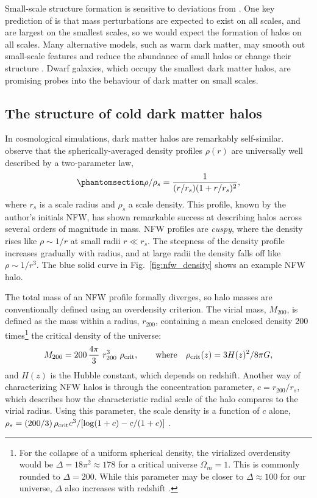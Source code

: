 Small-scale structure formation is sensitive to deviations from \LCDM{}
\citep[e.g.,][]{bechtol+2022}. One key prediction of \LCDM{} is that
mass perturbations are expected to exist on all scales, and are largest
on the smallest scales, so we would expect the formation of halos on all
scales. Many alternative models, such as warm dark matter, may smooth
out small-scale features and reduce the abundance of small halos or
change their structure \citep[e.g.,][]{lovell+2014}. Dwarf galaxies,
which occupy the smallest dark matter halos, are promising probes into
the behaviour of dark matter on small scales.

\subsection{The structure of cold dark matter halos}\label{sec:NFW}

In \LCDM{} cosmological simulations, dark matter halos are remarkably
self-similar. \citet{NFW1996, NFW1997} observe that the
spherically-averaged density profiles \(\rho(r)\) are universally well
described by a two-parameter law,
\begin{equation}\protect\phantomsection\label{eq:nfw}{
\rho/\rho_s= \frac{1}{(r/r_s)(1+r/r_s)^2},
}\end{equation} where \(r_s\) is a scale radius and \(\rho_s\) a scale
density. This profile, known by the author's initials NFW, has shown
remarkable success at describing \LCDM{} halos across several orders of
magnitude in mass. NFW profiles are \emph{cuspy}, where the density
rises like \(\rho \sim 1/r\) at small radii \(r \ll r_s\). The steepness
of the density profile increases gradually with radius, and at large
radii the density falls off like \(\rho \sim 1/r^3\). The blue solid
curve in Fig.~\ref{fig:nfw_density} shows an example NFW halo.

The total mass of an NFW profile formally diverges, so halo masses are
conventionally defined using an overdensity criterion. The virial mass,
\(M_{200}\), is defined as the mass within a radius, \(r_{200}\),
containing a mean enclosed density 200 times\footnote{For the collapse
  of a uniform spherical density, the virialized overdensity would be
  \(\Delta = 18\pi^2\approx 178\) for a critical universe
  \(\Omega_m = 1\). This is commonly rounded to \(\Delta = 200\). While
  this parameter may be closer to \(\Delta \approx 100\) for our
  universe, \(\Delta\) also increases with redshift \citep[see, e.g.,
  eq. 6 from][]{bryan+norman1998}.} the critical density of the
universe: \begin{equation}{
M_{200} =200\,\frac{4\pi}{3} \ r_{200}^3\ \rho_{\rm crit}, \qquad {\rm where} \quad \rho_{\rm crit}(z) = 3H(z)^2 / 8\pi G,
}\end{equation} and \(H(z)\) is the Hubble constant, which depends on
redshift. Another way of characterizing NFW halos is through the
concentration parameter, \(c=r_{200} / r_s\), which describes how the
characteristic radial scale of the halo compares to the virial radius.
Using this parameter, the scale density is a function of \(c\) alone,
\(\rho_s = (200/3)\,\rho_{\rm crit} c^3 / [\log(1+c) - c/(1+c)]\)
\citep{NFW1996}.

